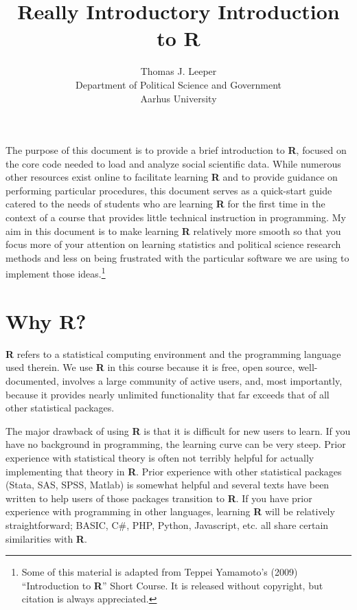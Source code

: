 \documentclass[12pt]{article}\usepackage[]{graphicx}\usepackage[]{color}
\title{Really Introductory Introduction to R}
\author{Thomas J. Leeper\\
Department of Political Science and Government\\
Aarhus University}
\begin{document}
\maketitle

{\abstract The purpose of this document is to provide a brief introduction to \textbf{R}, focused on the core code needed to load and analyze social scientific data. While numerous other resources exist online to facilitate learning \textbf{R} and to provide guidance on performing particular procedures, this document serves as a quick-start guide catered to the needs of students who are learning \textbf{R} for the first time in the context of a course that provides little technical instruction in programming. My aim in this document is to make learning \textbf{R} relatively more smooth so that you focus more of your attention on learning statistics and political science research methods and less on being frustrated with the particular software we are using to implement those ideas.\footnote{Some of this material is adapted from Teppei Yamamoto's (2009) ``Introduction to \textbf{R}'' Short Course. It is released without copyright, but citation is always appreciated.}}

\section{Why R?}\label{sec:intro}
\textbf{R} refers to a statistical computing environment and the programming language used therein. We use \textbf{R} in this course because it is free, open source, well-documented, involves a large community of active users, and, most importantly, because it provides nearly unlimited functionality that far exceeds that of all other statistical packages.

The major drawback of using \textbf{R} is that it is difficult for new users to learn. If you have no background in programming, the learning curve can be very steep. Prior experience with statistical theory is often not terribly helpful for actually implementing that theory in \textbf{R}. Prior experience with other statistical packages (Stata, SAS, SPSS, Matlab) is somewhat helpful and several texts have been written to help users of those packages transition to \textbf{R}. If you have prior experience with programming in other languages, learning \textbf{R} will be relatively straightforward; BASIC, C\#, PHP, Python, Javascript, etc. all share certain similarities with \textbf{R}.
\end{document}
